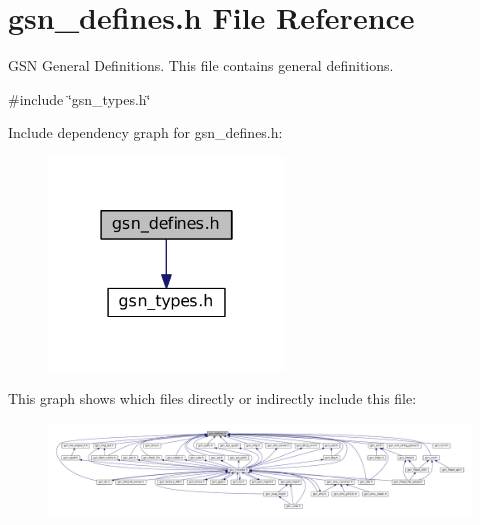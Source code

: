 \hypertarget{a00481}{
\section{gsn\_\-defines.h File Reference}
\label{a00481}
}


GSN General Definitions. This file contains general definitions.  


{\ttfamily \#include \char`\"{}gsn\_\-types.h\char`\"{}}\par
Include dependency graph for gsn\_\-defines.h:
\nopagebreak
\begin{figure}[H]
\begin{center}
\leavevmode
\includegraphics[width=178pt]{a00708}
\end{center}
\end{figure}
This graph shows which files directly or indirectly include this file:
\nopagebreak
\begin{figure}[H]
\begin{center}
\leavevmode
\includegraphics[width=400pt]{a00709}
\end{center}
\end{figure}
